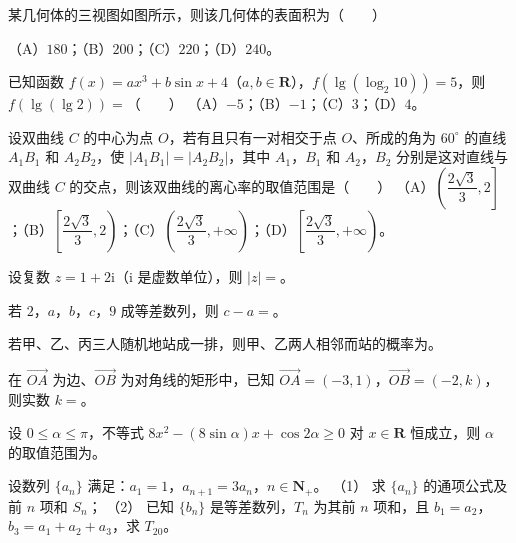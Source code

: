 \begin{question}
某几何体的三视图如图所示，则该几何体的表面积为\mbox{（　　）}
\nopagebreak[4]
\begin{center}\end{center}
\nopagebreak[4]
（A）$180$；（B）$200$；（C）$220$；（D）$240$。
\end{question}
\begin{question}
已知函数 $f(x)=ax^3+b\sin x+4$（$a,b\in\mathbf R$），$f(\lg(\log_2 10))=5$，则 $f(\lg(\lg 2))=$\mbox{（　　）}
（A）$-5$；（B）$-1$；（C）$3$；（D）$4$。
\end{question}
\begin{question}
设双曲线 $C$ 的中心为点 $O$，若有且只有一对相交于点 $O$、所成的角为 $60^\circ$ 的直线 $A_1B_1$ 和 $A_2B_2$，使 $|A_1B_1|=|A_2B_2|$，其中 $A_1$，$B_1$ 和 $A_2$，$B_2$ 分别是这对直线与双曲线 $C$ 的交点，则该双曲线的离心率的取值范围是\mbox{（　　）}
（A）$\left(\dfrac{2\sqrt3}3,2\right]$；（B）$\left[\dfrac{2\sqrt3}3,2\right)$；（C）$\left(\dfrac{2\sqrt3}3,+\infty\right)$；（D）$\left[\dfrac{2\sqrt3}3,+\infty\right)$。
\end{question}
\begin{question}
设复数 $z=1+2\mathrm i$（$\mathrm i$ 是虚数单位），则 $|z|=$\gkblank{}。
\end{question}
\begin{question}
若 $2$，$a$，$b$，$c$，$9$ 成等差数列，则 $c-a=$\gkblank{}。
\end{question}
\begin{question}
若甲、乙、丙三人随机地站成一排，则甲、乙两人相邻而站的概率为\gkblank{}。
\end{question}
\begin{question}
在 $\overrightarrow{OA}$ 为边、$\overrightarrow{OB}$ 为对角线的矩形中，已知 $\overrightarrow{OA}=(-3,1)$，$\overrightarrow{OB}=(-2,k)$，则实数 $k=$\gkblank{}。
\end{question}
\begin{question}
设 $0\leqslant\alpha\leqslant\pi$，不等式 $8x^2-(8\sin\alpha)x+\cos2\alpha\geqslant0$ 对 $x\in\mathbf R$ 恒成立，则 $\alpha$ 的取值范围为\gkblank{}。
\end{question}
\begin{question}
设数列 $\{a_n\}$ 满足：$a_1=1$，$a_{n+1}=3a_n$，$n\in\mathbf N_+$。
（1） 求 $\{a_n\}$ 的通项公式及前 $n$ 项和 $S_n$；
（2） 已知 $\{b_n\}$ 是等差数列，$T_n$ 为其前 $n$ 项和，且 $b_1=a_2$，$b_3=a_1+a_2+a_3$，求 $T_{20}$。
\end{question}
